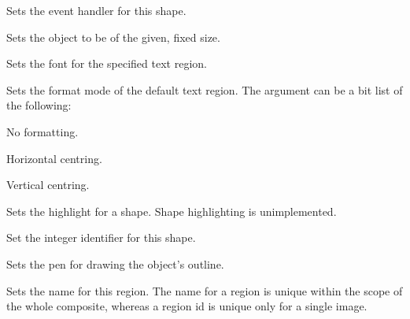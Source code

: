 
Sets the event handler for this shape.



Sets the object to be of the given, fixed size.



Sets the font for the specified text region.

\label{setformatmode}


Sets the format mode of the default text region. The argument can be a bit list
of the following:

\begin{description}\itemsep=0pt
\item[FORMAT\_NONE] No formatting.
\item[FORMAT\_CENTRE\_HORIZ] Horizontal centring.
\item[FORMAT\_CENTRE\_VERT] Vertical centring.
\end{description}



Sets the highlight for a shape. Shape highlighting is unimplemented.



Set the integer identifier for this shape.



Sets the pen for drawing the object's outline.

\label{setregionname}


Sets the name for this region. The name for a region is unique within the scope of the whole
composite, whereas a region id is unique only for a single image.

